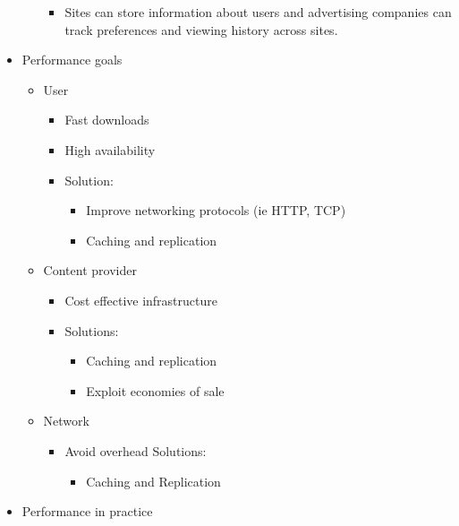 \documentclass[]{article}
\providecommand{\tightlist}{%
  \setlength{\itemsep}{0pt}\setlength{\parskip}{0pt}}
\begin{document}
\begin{itemize}
\begin{itemize}
    \begin{itemize}
    \tightlist
    \item
      Sites can store information about users and advertising companies
      can track preferences and viewing history across sites.
    \end{itemize}
  \end{itemize}
\item
  Performance goals

  \begin{itemize}
  \tightlist
  \item
    User

    \begin{itemize}
    \tightlist
    \item
      Fast downloads
    \item
      High availability
    \item
      Solution:

      \begin{itemize}
      \tightlist
      \item
        Improve networking protocols (ie HTTP, TCP)
      \item
        Caching and replication
      \end{itemize}
    \end{itemize}
  \item
    Content provider

    \begin{itemize}
    \tightlist
    \item
      Cost effective infrastructure
    \item
      Solutions:

      \begin{itemize}
      \tightlist
      \item
        Caching and replication
      \item
        Exploit economies of sale
      \end{itemize}
    \end{itemize}
  \item
    Network

    \begin{itemize}
    \tightlist
    \item
      Avoid overhead Solutions:

      \begin{itemize}
      \tightlist
      \item
        Caching and Replication
      \end{itemize}
    \end{itemize}
  \end{itemize}
\item
  Performance in practice


\end{itemize}
\end{document}
